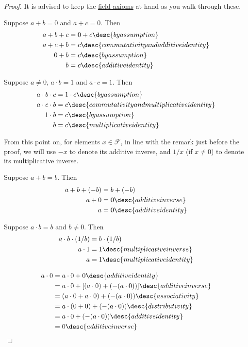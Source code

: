 \begin{proof}
  It is advised to keep the \href{aec6040}{field axioms} at hand as you walk
  through these.

   Suppose $a+b=0$ and $a+c=0$. Then
  \begin{align*}
    a+b+c &=0+c\desc{by assumption}                     \\
    a+c+b &=c\desc{commutativity and additive identity} \\
    0+b   &=c\desc{by assumption}                       \\
    b     &=c\desc{additive identity}
  \end{align*}

   Suppose $a\neq0$, $a\cdot b=1$ and $a\cdot c=1$. Then
  \begin{align*}
    a\cdot b\cdot c &=1\cdot c\desc{by assumption}                      \\
    a\cdot c\cdot b &=c\desc{commutativity and multiplicative identity} \\
    1\cdot b        &=c\desc{by assumption}                             \\
    b               &=c\desc{multiplicative identity}
  \end{align*}

  From this point on, for elements $x\in\mathcal F$, in line with the remark
  just before the proof, we will use $-x$ to denote its additive inverse, and
  $1/x$ (if $x\neq0$) to denote its multiplicative inverse.

   Suppose $a+b=b$. Then
  \begin{align*}
    a+b+(-b) &=b+(-b)                    \\
    a+0      &=0\desc{additive inverse}  \\
    a        &=0\desc{additive identity}
  \end{align*}

   Suppose $a\cdot b=b$ and $b\neq0$. Then
  \begin{align*}
    a\cdot b\cdot(1/b) &=b\cdot(1/b)                     \\
    a\cdot1            &=1\desc{multiplicative inverse}  \\
    a                  &=1\desc{multiplicative identity}
  \end{align*}

  \begin{align*}
    a\cdot0 &= a\cdot0+0\desc{additive identity}                       \\
            &= a\cdot0+[(a\cdot0)+(-(a\cdot0))]\desc{additive inverse} \\
            &= (a\cdot0+a\cdot0)+(-(a\cdot0))\desc{associativity}      \\
            &= a\cdot(0+0)+(-(a\cdot0))\desc{distributivity}           \\
            &= a\cdot0+(-(a\cdot0))\desc{additive identity}            \\
            &= 0\desc{additive inverse}
  \end{align*}


\end{proof}
